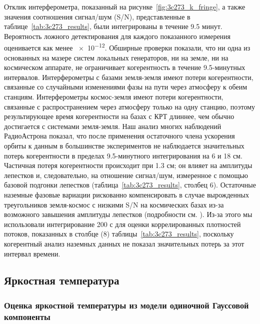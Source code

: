 Отклик интерферометра, показанный на рисунке~\ref{fig:3c273_k_fringe}, а также значения соотношения
сигнал/шум (S/N), представленные в таблице~\ref{tab:3c273_results}, были интегрированы в течение 9.5
минут. Вероятность ложного детектирования для каждого показанного измерения оценивается как менее
\num{e-12}. Обширные проверки показали, что ни одна из основанных на мазере систем локальных
генераторов, ни на земле, ни на космическом аппарате, не ограничивает когерентность в течение
9.5-минутных интервалов. Интерферометры с базами земля-земля имеют потери когерентности, связанные
со случайными изменениями фазы на пути через атмосферу к обеим станциям. Интерферометры космос-земля
имеют потери когерентности, связанные с распространением через атмосферу только на одну станцию,
поэтому результирующее время когерентности на базах с КРТ длиннее, чем обычно достигается с
системами земля-земля. Наш анализ многих наблюдений РадиоАстрона показал, что после применения
остаточного члена ускорения орбиты к данным в большинстве экспериментов не наблюдается значительных
потерь когерентности в пределах 9.5-минутного интегрирования на 6 и 18 см. Частичная потеря
когерентности происходит при 1.3 см; он влияет на амплитуды лепестков и, следовательно, на отношение
сигнал/шум, измеренное с помощью базовой подгонки лепестков (таблица~\ref{tab:3c273_results},
столбец 6). Остаточные наземные фазовые вариации рискованно компенсировать в случае вырожденных
треугольников земля-космос с низкими S/N на космических базах из-за возможного завышения амплитуды
лепестков (подробности см. \cite{Marti_Vidal_2008}). Из-за этого мы использовали интегрирование 200
с для оценки коррелированных плотностей потоков, показанных в столбце (8)
таблицы~\ref{tab:3c273_results}, поскольку когерентный анализ наземных данных не показал
значительных потерь за этот интервал времени.

\subsection{Яркостная температура}

\subsubsection{Оценка яркостной температуры из модели одиночной Гауссовой компоненты}

